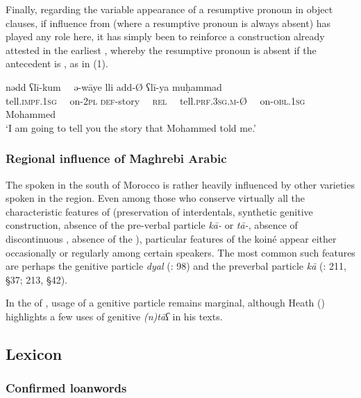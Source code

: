 \documentclass[output=paper]{langsci/langscibook}
\begin{document}
Finally, regarding the variable appearance of a resumptive pronoun in  object  clauses, if influence from  (where a resumptive pronoun is always absent) has played any role here, it has simply been to reinforce a construction already attested in the earliest , whereby the resumptive pronoun is absent if the antecedent is , as in ‎(1).

\ea
\gll n{\R}ədd ʕlī-kum~~ ə{\R}-{\R}wāye lli {\R}add-Ø ʕlī-ya muḥammad\\
 tell.\textsc{impf.}1\textsc{sg}~~ on-2\textsc{pl} \textsc{def-}story~~ \textsc{rel}~~ tell.\textsc{prf.3sg.m-}Ø~~ on-\textsc{obl.1sg} Mohammed\\
\glt ‘I am going to tell you the story that Mohammed told me.’ 
\z

\subsubsection{Regional influence of Maghrebi Arabic} %

The  spoken in the south of Morocco is rather heavily influenced by other  varieties spoken in the region. Even among those who conserve virtually all the characteristic features of  (preservation of interdentals, synthetic genitive construction, absence of the pre-verbal particle \textit{kā-} or \textit{tā-}, absence of discontinuous , absence of the ), particular features of the   koiné appear either occasionally or regularly among certain speakers. The most common such features are perhaps the genitive particle \textit{dyal} (\citealt{Taine-Cheikh1997socio}: 98) and the preverbal particle \textit{kā} (\citealt{Aguadé1998}: 211, §37; 213, §42).

In the  of , usage of a genitive particle remains marginal, although Heath (\citeyear[162]{Heath2004}) highlights a few uses of genitive \textit{(n)tāʕ} in his texts.

\subsection{Lexicon} %

\subsubsection{Confirmed loanwords} %
\end{document}

